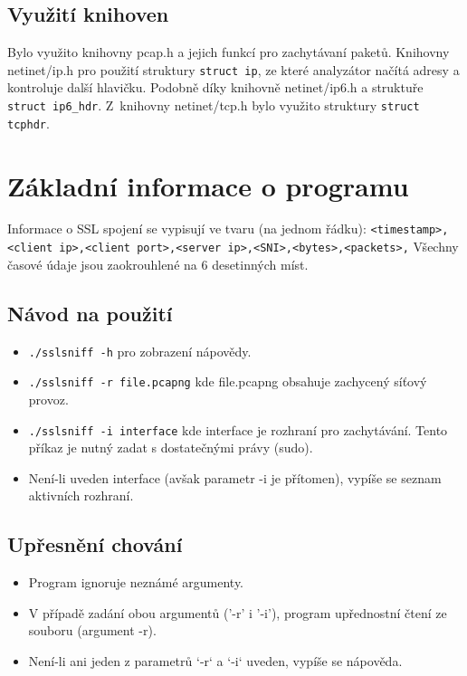 \documentclass[a4paper, 12pt, titlepage]{article}
\begin{document}
\subsection{Využití knihoven}

Bylo využito knihovny pcap.h a jejich funkcí pro zachytávaní paketů. Knihovny netinet/ip.h pro použití struktury \verb|struct ip|, ze které analyzátor načítá adresy a kontroluje další hlavičku. Podobně díky knihovně netinet/ip6.h a struktuře \verb|struct ip6_hdr|. Z~knihovny netinet/tcp.h bylo využito struktury \verb|struct tcphdr|. 

\section{Základní informace o programu}
Informace o SSL spojení se vypisují ve tvaru (na jednom řádku): \newline 
\texttt{\small<timestamp>,<client ip>,<client port>,<server ip>,<SNI>,<bytes>,<packets>,}
\newline
Všechny časové údaje jsou zaokrouhlené na 6 desetinných míst.

\subsection{Návod na použití}
\begin{itemize}
  \item \verb|./sslsniff -h| pro zobrazení nápovědy.
  \item \verb|./sslsniff -r file.pcapng| kde file.pcapng obsahuje zachycený síťový provoz.
  \item \verb|./sslsniff -i interface| kde interface je rozhraní pro zachytávání. Tento příkaz je nutný zadat s dostatečnými právy (sudo).
  \item Není-li uveden interface (avšak parametr -i je přítomen), vypíše se seznam aktivních rozhraní.
\end{itemize}

\subsection{Upřesnění chování}
\begin{itemize}
    \item Program ignoruje neznámé argumenty.
    \item V případě zadání obou argumentů ('-r' i '-i'), program upřednostní čtení ze souboru (argument -r).
    \item Není-li ani jeden z parametrů `-r` a `-i` uveden, vypíše se nápověda. 
\end{itemize}
\end{document}
